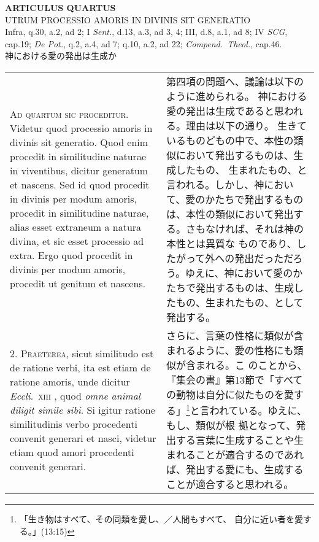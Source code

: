 \documentclass[10pt]{jsarticle} %
\begin{document}
\begin{center}
 {\Large {\bf ARTICULUS QUARTUS}}\\
 {\large UTRUM PROCESSIO AMORIS IN DIVINIS SIT GENERATIO}\\
 {\footnotesize Infra, q.30, a.2, ad 2; I {\itshape Sent.}, d.13, a.3, ad 3, 4; III, d.8, a.1, ad 8; IV {\itshape SCG}, cap.19; {\itshape De Pot.}, q.2, a.4, ad 7; q.10, a.2, ad 22; {\itshape Compend.~Theol.}, cap.46.}\\
 {\Large 神における愛の発出は生成か\\}
\end{center}

\begin{longtable}{p{21em}p{21em}}


{\Huge A}{\scshape d quartum sic proceditur}. Videtur quod processio
 amoris in divinis sit generatio. Quod enim procedit in similitudine
 naturae in viventibus, dicitur generatum et nascens. Sed id quod
 procedit in divinis per modum amoris, procedit in similitudine naturae,
 alias esset extraneum a natura divina, et sic esset processio ad
 extra. Ergo quod procedit in divinis per modum amoris, procedit ut
 genitum et nascens.

&

第四項の問題へ、議論は以下のように進められる。
神における愛の発出は生成であると思われる。理由は以下の通り。
生きているものどもの中で、本性の類似において発出するものは、生成したもの、
 生まれたもの、と言われる。しかし、神において、愛のかたちで発出するもの
 は、本性の類似において発出する。さもなければ、それは神の本性とは異質な
 ものであり、したがって外への発出だっただろう。ゆえに、神において愛のか
 たちで発出するものは、生成したもの、生まれたもの、として発出する。


\\



2. {\scshape Praeterea}, sicut similitudo est de ratione verbi, ita est
 etiam de ratione amoris, unde dicitur {\itshape Eccli}.~{\scshape xiii} , quod {\itshape omne animal
 diligit simile sibi}. Si igitur ratione similitudinis verbo procedenti
 convenit generari et nasci, videtur etiam quod amori procedenti
 convenit generari.

&

さらに、言葉の性格に類似が含まれるように、愛の性格にも類似が含まれる。こ
 のことから、『集会の書』第13節で「すべての動物は自分に似たものを愛する」\footnote{「生き物はすべて、その同類を愛し、／人間もすべて、
 自分に近い者を愛する。」(13:15)}と言われている。ゆえに、もし、類似が根
 拠となって、発出する言葉に生成することや生まれることが適合するのであれ
 ば、発出する愛にも、生成することが適合すると思われる。


\end{longtable}
\end{document}
